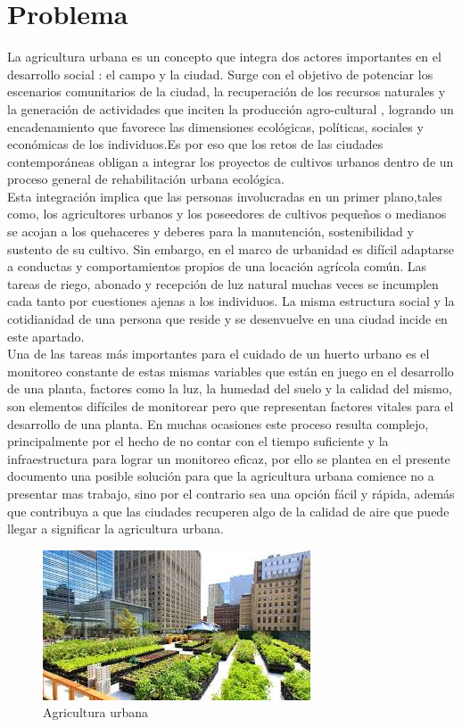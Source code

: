 \chapter{Problema}
La agricultura urbana es un concepto que integra dos actores importantes en el desarrollo social : el campo y la ciudad. Surge con el objetivo de potenciar los escenarios comunitarios de la ciudad, la recuperación de los recursos naturales y la generación de actividades que inciten la producción agro-cultural , logrando un encadenamiento que favorece las dimensiones ecológicas, políticas, sociales y económicas de los individuos.Es por eso que los retos de las ciudades contemporáneas obligan a integrar
los proyectos de cultivos urbanos dentro de un proceso
general de rehabilitación urbana ecológica. \cite{moran2010agricultura} \\

Esta integración implica que las personas  involucradas en un primer plano,tales como, los agricultores urbanos y los poseedores de cultivos pequeños o medianos se acojan a los quehaceres y deberes para la manutención, sostenibilidad y sustento de su cultivo. Sin embargo, en el marco de urbanidad es difícil adaptarse a conductas y comportamientos propios de una locación agrícola común. Las tareas de riego, abonado y recepción de luz natural muchas veces se incumplen cada tanto por cuestiones ajenas a los individuos. La misma estructura social y la cotidianidad de una persona que reside y se desenvuelve en una ciudad incide en este apartado.\\

Una de las tareas más importantes para el cuidado de un huerto urbano es el monitoreo constante de estas mismas variables que están en juego en el desarrollo de una planta, factores como la luz, la humedad del suelo y la calidad del mismo, son elementos difíciles de monitorear pero que representan factores vitales para el desarrollo de una planta. En muchas ocasiones este proceso resulta complejo, principalmente por el hecho de no contar con el tiempo suficiente y la infraestructura para lograr un monitoreo eficaz, por ello se plantea en el presente documento una posible solución para que la agricultura urbana comience no a presentar mas trabajo, sino por el contrario sea una opción fácil y rápida, además que contribuya a que las ciudades recuperen algo de la calidad de aire que puede llegar a significar la agricultura urbana.

\begin{figure}[th!]
	\centering
	\includegraphics[width=0.7\linewidth]{proyecto/imgs/agriculturaurbana}
	\caption{Agricultura urbana}
	\label{fig:rup}
\end{figure}

